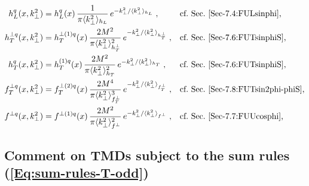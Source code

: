 \documentclass[a4paper,11pt]{article}
\newcommand{\la}{\langle}
\newcommand{\ra}{\rangle}
\def\kperp{k_\perp}
\def\avkperp{\la \kperp^2 \ra}
\begin{document}
{\begin{subequations}
\begin{align}
	h_L^q(x,\kperp^2) 
	  &= 	h_L^q(x) \,\frac{1}{\pi \avkperp_{h_{L}}}\,
		e^{-\kperp^2/{\avkperp_{h_{L}}}}\;,
	  && 	\mbox{cf.\ Sec.~\ref{Sec-7.4:FULsinphi},}
		\label{eq:hLnew}\\
	h_T^{\perp q}(x,\kperp^2) 
	  &=	h_T^{\perp (1) q}(x)\,\frac{2 M^2}{\pi \avkperp_{h_{T}^\perp}^2}\,
	  	e^{-\kperp^2/{\avkperp_{h_{T}^\perp}}}\;,
	  && 	\mbox{cf.\ Sec.~\ref{Sec-7.6:FUTsinphiS},}
		\label{eq:hTperpnew}\\
	h_T^{q}(x,\kperp^2) 
	  &=	h_T^{(1) q}(x) \,\frac{2 M^2}{\pi \avkperp_{h_{T}}^2}\,
		e^{-\kperp^2/{\avkperp_{h_{T}}}}\;,
	  && 	\mbox{cf.\ Sec.~\ref{Sec-7.6:FUTsinphiS},}
		\label{eq:hTnew}\\
	f^{\perp q}_{T}(x,\kperp^2) 
	  &= 	f^{\perp (2) q}_{T}(x)\,\frac{2 M^4}{\pi \avkperp^3_{f_{T}^{\perp} }}\,
		e^{-\kperp^2/{\avkperp_{f_{T}^{\perp} }}}\;,
	  && 	\mbox{cf.\ Sec.~\ref{Sec-7.8:FUTsin2phi-phiS},}
		\label{eq:ftperpnew}\\
	f^{\perp q}(x,\kperp^2) 
	  &= 	f^{\perp (1) q}(x) \,\frac{2 M^2}{\pi \avkperp_{f^\perp}^2}\,
		e^{-\kperp^2/{\avkperp_{f^\perp}}}\;,
	  && 	\mbox{cf.\ Sec.~\ref{Sec-7.7:FUUcosphi},}
		\label{eq:fperpnew}
\end{align}\end{subequations}

{}


\subsection{Comment on TMDs subject to the sum rules (\ref{Eq:sum-rules-T-odd})}
\label{App-B:comment-Todd-twist-3}

}
\end{document}
